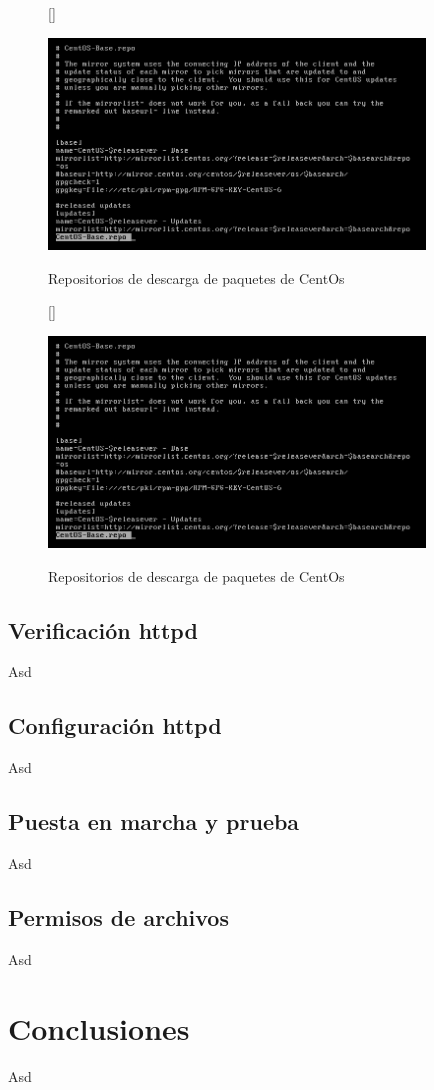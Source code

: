 \documentclass[11pt]{article}
\begin{document}
\begin{figure}[ht]
[\FBwidth]
{\caption{Repositorios de descarga de paquetes de CentOs}\label{fig:repositorios}}
{\includegraphics[width=10cm]{screenshots/httpd-install/repositorios-centos.png}}
\end{figure}

\begin{figure}[ht]
[\FBwidth]
{\caption{Repositorios de descarga de paquetes de CentOs}\label{fig:repositorios}}
{\includegraphics[width=10cm]{screenshots/httpd-install/repositorios-centos.png}}
\end{figure}

\subsection{Verificación httpd}
Asd

\subsection{Configuración httpd}
Asd

\subsection{Puesta en marcha y prueba}
Asd

\subsection{Permisos de archivos}
Asd
\section{Conclusiones}
Asd
\end{document}
